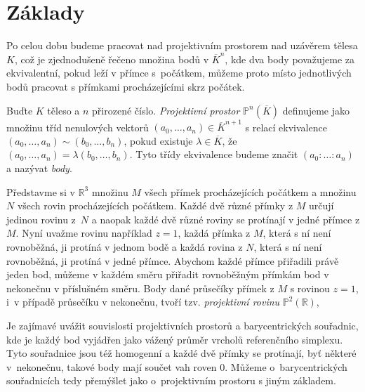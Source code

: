 \documentclass[12pt]{report}
\begin{document}
\section{Základy}


Po celou dobu budeme pracovat nad projektivním prostorem nad uzávěrem tělesa $K$, což je zjednodušeně řečeno množina bodů v $\overline{K}^n$, kde dva body považujeme za ekvivalentní, pokud leží v přímce s~počátkem, můžeme proto místo jednotlivých bodů pracovat s přímkami procházejícími skrz počátek.
\begin{definice}
Buďte $K$ těleso a $n$ přirozené číslo. \textit{Projektivní prostor} $\mathbb{P}^n (\overline{K})$ definujeme jako množinu tříd nenulových vektorů $(a_0, \dots, a_n) \in \overline{K}^{n+1}$ s relací ekvivalence $(a_0, \dots, a_n) \sim (b_0, \dots, b_n)$, pokud existuje $\lambda \in \overline{K}$, že $(a_0, \dots, a_n) = \lambda (b_0, \dots, b_n)$. Tyto třídy ekvivalence budeme značit $(a_0 : \dots : a_n)$ a nazývat \textit{body}.
\end{definice}

Představme si v $\mathbb{R}^3$ množinu $M$ všech přímek procházejících počátkem a množinu $N$ všech rovin procházejících počátkem. Každé dvě různé přímky z $M$ určují jedinou rovinu z~$N$ a naopak každé dvě různé roviny se protínají v jedné přímce z $M$. Nyní uvažme rovinu například $z=1$, každá přímka z $M$, která s ní není rovnoběžná, ji protíná v jednom bodě a každá rovina z $N$, která s ní není rovnoběžná, ji protíná v jedné přímce. Abychom každé přímce přiřadili právě jeden bod, můžeme v každém směru přiřadit rovnoběžným přímkám bod v nekonečnu v příslušném směru. Body dané průsečíky přímek z $M$ s rovinou $z=1$, i~v případě průsečíku v nekonečnu, tvoří tzv. \textit{projektivní rovinu} $\mathbb{P}^2 (\mathbb{R})$,

\begin{poznamka}
Je zajímavé uvážit souvislosti projektivních prostorů a barycentrických souřadnic, kde je každý bod vyjádřen jako vážený průměr vrcholů referenčního simplexu. Tyto souřadnice jsou též homogenní a každé dvě přímky se protínají, byť některé v~nekonečnu, takové body mají součet vah roven $0$. Můžeme o~barycentrických souřadnicích tedy přemýšlet jako o~projektivním prostoru s jiným základem.
\end{poznamka}
\end{document}
